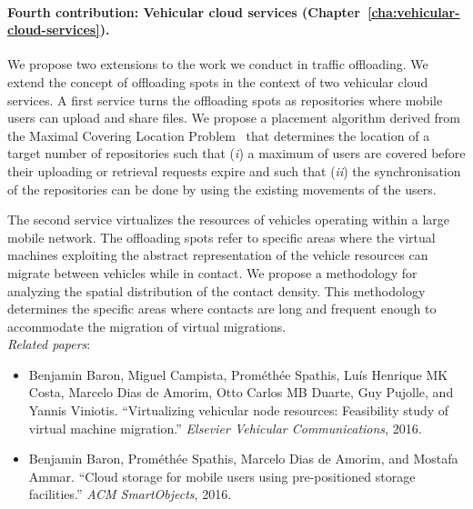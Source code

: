 \paragraph{Fourth contribution: Vehicular cloud services (Chapter~\ref{cha:vehicular-cloud-services}).}

We propose two extensions to the work we conduct in traffic offloading. We extend the concept of offloading spots in the context of two vehicular cloud services. A first service turns the offloading spots as repositories where mobile users can upload and share files. We propose a placement algorithm derived from the Maximal Covering Location Problem~\cite{church1974maximal} that determines the location of a target number of repositories such that (\textit{i}) a maximum of users are covered before their uploading or retrieval requests expire and such that (\textit{ii}) the synchronisation of the repositories can be done by using the existing movements of the users.

The second service virtualizes the resources of vehicles operating within a large mobile network. The offloading spots refer to specific areas where the virtual machines exploiting the abstract representation of the vehicle resources can migrate between vehicles while in contact. We propose a methodology for analyzing the spatial distribution of the contact density. This methodology determines the specific areas where contacts are long and frequent enough to accommodate the migration of virtual migrations.\\[3pt]
\textit{Related papers}:
\begin{itemize}
    \item Benjamin Baron, Miguel Campista, Prométhée Spathis, Luís Henrique MK Costa, Marcelo Dias de Amorim, Otto Carlos MB Duarte, Guy Pujolle, and Yannis Viniotis. ``Virtualizing vehicular node resources: Feasibility study of virtual machine migration.'' \textit{Elsevier Vehicular Communications}, 2016.
    \item Benjamin Baron, Prométhée Spathis, Marcelo Dias de Amorim, and Mostafa Ammar. ``Cloud storage for mobile users using pre-positioned 
    storage facilities.'' \textit{ACM SmartObjects}, 2016.
\end{itemize}

